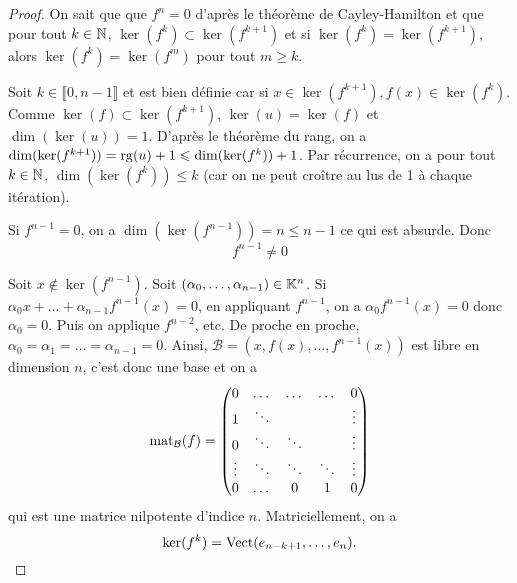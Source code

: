 \documentclass[12pt]{article}
\begin{document}
\begin{proof}
	On sait que que $f^{n}=0$ d'après le théorème de Cayley-Hamilton et que pour tout $k\in\mathbb{N}$, $\ker(f^{k})\subset\ker(f^{k+1})$ et si $\ker(f^{k})=\ker(f^{k+1})$, alors $\ker(f^{k})=\ker(f^{m})$ pour tout $m\geqslant k$.

	Soit $k\in\llbracket0,n-1\rrbracket$ et  est bien définie car si $x\in\ker(f^{k+1}),f(x)\in\ker(f^{k})$. Comme $\ker(f)\subset\ker(f^{k+1})$, $\ker(u)=\ker(f)$ et $\dim(\ker(u))=1$. D'après le théorème du rang, on a $\dim(\ker(f^{k+1}))=\operatorname{rg}(u)+1\leqslant\dim(\ker(f^{k}))+1$. Par récurrence, on a pour tout $k\in\mathbb{N}$, $\dim(\ker(f^{k}))\leqslant k$ (car on ne peut croître au lus de 1 à chaque itération).

	Si $f^{n-1}=0$, on a $\dim(\ker(f^{n-1}))=n\leqslant n-1$ ce qui est absurde. Donc 
	\begin{equation}
		\boxed{f^{n-1}\neq0}
	\end{equation}

	Soit $x\notin\ker(f^{n-1})$. Soit $(\alpha_{0},\dots,\alpha_{n-1})\in\mathbb{K}^{n}$. Si $\alpha_{0}x+\dots+\alpha_{n-1}f^{n-1}(x)=0$, en appliquant $f^{n-1}$, on a $\alpha_{0}f^{n-1}(x)=0$ donc $\alpha_{0}=0$. Puis on applique $f^{n-2}$, etc. De proche en proche, $\alpha_{0}=\alpha_{1}=\dots=\alpha_{n-1}=0$. Ainsi, $\mathcal{B}=(x,f(x),\dots,f^{n-1}(x))$ est libre en dimension $n$, c'est donc une base et on a 
	\begin{equation}
		\operatorname{mat}_{\mathcal{B}}(f)=
		\begin{pmatrix}
			0&\dots&\dots&\dots&0\\
			1&\ddots&&&\vdots\\
			0&\ddots&\ddots&&\vdots\\
			\vdots&\ddots&\ddots&\ddots&\vdots\\
			0&\dots&0&1&0
		\end{pmatrix}
	\end{equation}
	qui est une matrice nilpotente d'indice $n$. Matriciellement, on a 
	\begin{equation*}
		\ker(f^{k})=\operatorname{Vect}(e_{n-k+1},\dots,e_{n}).
	\end{equation*}
\end{proof}
\end{document}
